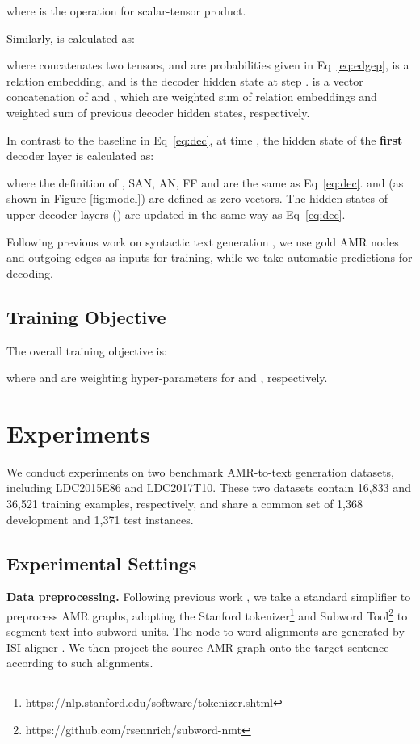 \documentclass[11pt,a4paper]{article}
\begin{document}
where  is the operation for scalar-tensor product.


Similarly,  is calculated as:

where  concatenates two tensors,  and  are probabilities given in Eq~\ref{eq:edgep},
 is a relation embedding, and  is the decoder hidden state at step .
 is a vector concatenation of  and , which are weighted sum of relation embeddings and weighted sum of previous decoder hidden states, respectively.


In contrast to the baseline in Eq~\ref{eq:dec}, at time , the hidden state of the \textbf{first} decoder layer is calculated as: 

where the definition of , SAN, AN, FF and  are the same as Eq~\ref{eq:dec}.
 and  (as shown in Figure \ref{fig:model}) are defined as zero vectors.
The hidden states of upper decoder layers () are updated in the same way as Eq~\ref{eq:dec}.



Following previous work on syntactic text generation \cite{wu2017sequence,wang2018tree}, we use gold AMR nodes and outgoing edges as inputs for training, while we take automatic predictions for decoding.

\subsection{Training Objective}
The overall training objective is:

where  and  are weighting hyper-parameters
for  and , respectively.

\section{Experiments}
We conduct experiments on two benchmark AMR-to-text generation datasets, including LDC2015E86 and LDC2017T10.
These two datasets contain 16,833 and 36,521 training examples, respectively, and share a common set of 1,368 development and 1,371 test instances.

\subsection{Experimental Settings}
\label{sec:expsetting}

\noindent \textbf{Data preprocessing.} Following previous work \cite{song2018graph,zhu2019modeling}, we take a standard simplifier \cite{konstas2017neural} to preprocess AMR graphs, adopting the Stanford tokenizer\footnote{https://nlp.stanford.edu/software/tokenizer.shtml} and Subword Tool\footnote{https://github.com/rsennrich/subword-nmt} to segment text into subword units. 
The node-to-word alignments are generated by ISI aligner \cite{pourdamghani-etal-2014-aligning}. 
We then project the source AMR graph onto the target sentence according to such alignments.
\end{document}
